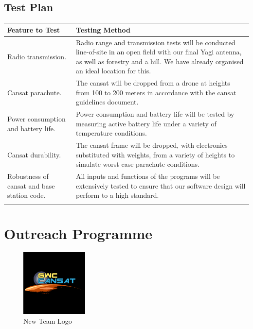 \documentclass{report}
\begin{document}
	\section{Test Plan}
		\begin{table}[h!]
		\setlength{\tabcolsep}{6pt}
		\begin{tabularx}{\textwidth}{@{} YY @{}}
			\toprule
			\textbf{Feature to Test} & 
			\textbf{Testing Method}\\
			\midrule
			Radio transmission. &
			Radio range and transmission tests will be conducted line-of-site in an
			open field with our final Yagi antenna, as well as forestry and a hill. We
			have already organised an ideal location for this.\\
			\addlinespace
			Cansat parachute. & 
			The cansat will be dropped from a drone at heights from 100 to 200
			meters in accordance with the cansat guidelines document.\\
			\addlinespace
			Power consumption and battery life. &
			Power consumption and battery life will be tested by measuring active
			battery life under a variety of temperature conditions.\\
			\addlinespace
			Cansat durability. &
			The cansat frame will be dropped, with electronics substituted with
			weights, from a variety of heights to simulate worst-case parachute
			conditions.\\
			\addlinespace
			Robustness of cansat and base station code. &
			All inputs and functions of the programs will be extensively tested to
			ensure that our software design will perform to a high standard.\\
			\addlinespace
			
			\bottomrule
		\end{tabularx}
		\end{table}

\chapter{Outreach Programme}
	\begin{figure}
		\vspace{-60pt}
 		\begin{center}
		\includegraphics[width=0.30\textwidth]{Logo}
		\end{center}
		\vspace{-15pt}
		\caption[X]{New Team Logo}
	\end{figure}
\end{document}
